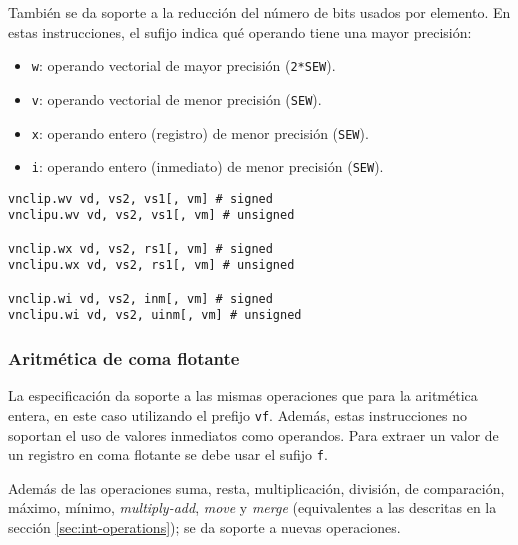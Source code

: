 También se da soporte a la reducción del número de bits usados por elemento.
En estas instrucciones, el sufijo indica qué operando tiene una mayor precisión:
\begin{itemize}
\item \texttt{w}: operando vectorial de mayor precisión (\texttt{2*SEW}).
\item \texttt{v}: operando vectorial de menor precisión (\texttt{SEW}).
\item \texttt{x}: operando entero (registro) de menor precisión (\texttt{SEW}).
\item \texttt{i}: operando entero (inmediato) de menor precisión (\texttt{SEW}).
\end{itemize}

\begin{lstlisting}
vnclip.wv vd, vs2, vs1[, vm] # signed
vnclipu.wv vd, vs2, vs1[, vm] # unsigned

vnclip.wx vd, vs2, rs1[, vm] # signed
vnclipu.wx vd, vs2, rs1[, vm] # unsigned

vnclip.wi vd, vs2, inm[, vm] # signed
vnclipu.wi vd, vs2, uinm[, vm] # unsigned
\end{lstlisting}

\subsubsection{Aritmética de coma flotante}
La especificación da soporte a las mismas operaciones que para la aritmética
entera, en este caso utilizando el prefijo \texttt{vf}. Además, estas
instrucciones no soportan el uso de valores inmediatos como operandos. Para
extraer un valor de un registro en coma flotante se debe usar el sufijo
\texttt{f}.

Además de las operaciones suma, resta, multiplicación, división, de
comparación, máximo, mínimo, \textit{multiply-add}, \textit{move} y
\textit{merge} (equivalentes a las descritas en la sección
\ref{sec:int-operations}); se da soporte a nuevas operaciones.

